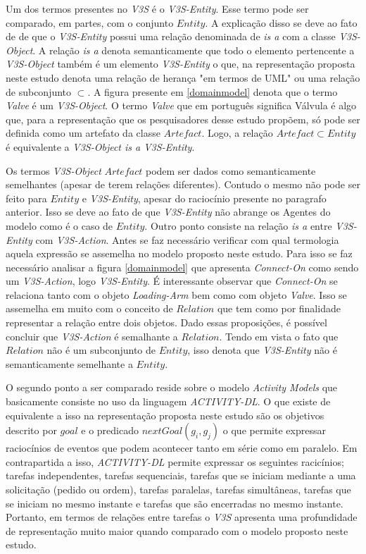 Um dos termos presentes no \textit{V3S} é o \textit{V3S-Entity}. Esse termo pode ser comparado, em partes, com o conjunto $ Entity $. A explicação disso se deve ao fato de de que o \textit{V3S-Entity} possui uma relação denominada de \textit{is a} com a classe \textit{V3S-Object}. A relação \textit{is a} denota semanticamente que todo o elemento pertencente a \textit{V3S-Object} também é um elemento \textit{V3S-Entity} o que, na representação proposta neste estudo denota uma relação de herança "em termos de UML" ou uma relação de subconjunto $ \subset $. A figura presente em \ref{domainmodel} denota que o termo \textit{Valve} é um \textit{V3S-Object}. O termo \textit{Valve} que em português significa Válvula é algo que, para a representação que os pesquisadores desse estudo propõem, só pode ser definida como um artefato da classe $Artefact$. Logo, a relação $Artefact \subset Entity $ é equivalente a \textit{V3S-Object is a V3S-Entity}.

Os termos \textit{V3S-Object} $Artefact$ podem ser dados como semanticamente semelhantes (apesar de terem relações diferentes). Contudo o mesmo não pode ser feito para $Entity$ e \textit{V3S-Entity}, apesar do raciocínio presente no paragrafo anterior. Isso se deve ao fato de que \textit{V3S-Entity} não abrange os Agentes do modelo como é o caso de $Entity$. Outro ponto consiste na relação \textit{is a} entre \textit{V3S-Entity} com \textit{V3S-Action}. Antes se faz necessário verificar com qual termologia aquela expressão se assemelha no modelo proposto neste estudo. Para isso se faz necessário analisar a figura \ref{domainmodel} que apresenta \textit{Connect-On} como sendo um \textit{V3S-Action}, logo \textit{V3S-Entity}. É interessante observar que \textit{Connect-On} se relaciona tanto com o objeto \textit{Loading-Arm} bem como com objeto \textit{Valve}. Isso se assemelha em muito com o conceito de $Relation$ que tem como por finalidade representar a relação entre dois objetos. Dado essas proposições, é possível concluir que \textit{V3S-Action} é semalhante a $Relation$. Tendo em vista o fato que $Relation$ não é um subconjunto 
de $Entity$, isso denota que \textit{V3S-Entity} não é semanticamente semelhante a $Entity$. 

O segundo ponto a ser comparado reside sobre o modelo \textit{Activity Models} que basicamente consiste no uso da linguagem \textit{ACTIVITY-DL}. O que existe de equivalente a isso na representação proposta neste estudo são os objetivos descrito por $goal$ e o predicado $nextGoal(g_i,g_j)$ o que permite expressar raciocínios de eventos que podem acontecer tanto em série como em paralelo. Em contrapartida a isso, \textit{ACTIVITY-DL} permite expressar os seguintes racicínios; tarefas independentes, tarefas sequenciais, tarefas que se iniciam mediante a uma solicitação (pedido ou ordem), tarefas paralelas, tarefas  simultâneas, tarefas que se iniciam no mesmo instante e tarefas que são encerradas no mesmo instante. Portanto, em termos de relações entre tarefas o \textit{V3S} apresenta uma profundidade de representação muito maior quando comparado com o modelo proposto neste estudo. 

